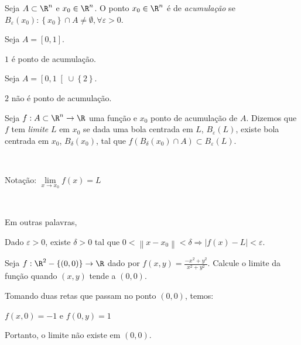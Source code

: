 \documentclass[11pt, oneside, a4paper]{gsm-l}
\begin{document}
\begin{defi}
Seja $A \subset \R^n$ e $x_0 \in \R^n$. O ponto $x_0 \in \R^n$ é de \textit{acumulação} se $B_\varepsilon  \left( {x_0 } \right):\left\{ {x_0 } \right\} \cap A \ne \emptyset ,\forall \varepsilon  > 0$.
\end{defi}

\begin{exem}
Seja $A = \left[ {0,1} \right]$.

$1$ é ponto de acumulação.

\end{exem}

\begin{exem}
Seja $A = \left[ {0,1} \right[ \cup \left\{ 2 \right\}$.

$2$ não é ponto de acumulação.
\end{exem}

\begin{defi}[Limite]
    Seja $f:A \subset \R^n  \to \R$ uma função e $x_0$ ponto de acumulação de $A$. Dizemos que $f$ tem \textit{limite} $L$ em $x_0$ se dada uma bola centrada em $L$, $B_\varepsilon  \left( L \right)$, existe bola centrada em $x_0$, $B_\delta  \left( {x_0 } \right)$, tal que $f\left( {B_\delta  \left( {x_0 } \right) \cap A} \right) \subset B_\varepsilon  \left( L \right)$.

\

Notação: $\displaystyle \mathop {\lim }\limits_{x \to x_0 } f\left( x \right) = L$

\

Em outras palavras,

    Dado $\varepsilon  > 0$, existe $\delta  > 0$ tal que $0 < \left\| {x - x_0 } \right\| < \delta  \Rightarrow \left| {f\left( x \right) - L} \right| < \varepsilon$.
\end{defi}

\begin{exem}
    Seja $f:\R^2  - \left\{ {\left( {0,0} \right)} \right\} \to \R$ dado por $\displaystyle f\left( {x,y} \right) = \frac{{ - x^2  + y^2 }}{{x^2  + y^2 }}$. Calcule o limite da função quando $(x,y)$ tende a $(0,0)$.
\end{exem}

\begin{sol}
Tomando duas retas que passam no ponto $(0,0)$, temos:

$f\left( {x,0} \right) =  - 1$ e $f\left( {0,y} \right) = 1$

Portanto, o limite não existe em $(0,0)$.
\end{sol}
\end{document}
